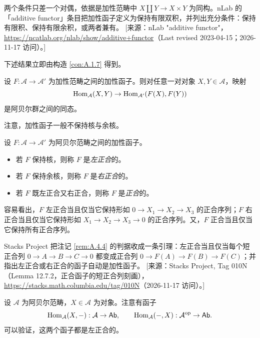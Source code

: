 \begin{yizhu}
两个条件只差一个对偶，依据是加性范畴中 $X\coprod Y\to X\times Y$ 为同构。nLab 的「additive functor」条目把加性函子定义为保持有限双积，并列出充分条件：保持有限积、保持有限余积，或两者兼有。
[来源：nLab "additive functor"，\url{https://ncatlab.org/nlab/show/additive+functor}（Last revised 2023-04-15；2026-11-17 访问）。]
\end{yizhu}

下述结果立即由构造 \ref{con:A.1.7} 得到。

\begin{lemma}\label{lem:A.4.2}
设 $F:\mathcal{A}\to\mathcal{A}'$ 为加性范畴之间的加性函子。则对任意一对对象 $X,Y\in\mathcal{A}$，映射
\[
\operatorname{Hom}_{\mathcal{A}}(X,Y)\to\operatorname{Hom}_{\mathcal{A}'}(F(X),F(Y))
\]
是阿贝尔群之间的同态。
\end{lemma}

注意，加性函子一般不保持核与余核。

\begin{definition}\label{def:A.4.3}
设 $F:\mathcal{A}\to\mathcal{A}'$ 为阿贝尔范畴之间的加性函子。
\begin{itemize}[leftmargin=2em,itemsep=0.25ex]
  \item 若 $F$ 保持核，则称 $F$ 是\emph{左正合}的。
  \item 若 $F$ 保持余核，则称 $F$ 是\emph{右正合}的。
  \item 若 $F$ 既左正合又右正合，则称 $F$ 是\emph{正合}的。
\end{itemize}
\end{definition}

\begin{remark}\label{rem:A.4.4}
容易看出，$F$ 左正合当且仅当它保持形如 $0\to X_1\to X_2\to X_3$ 的正合序列；$F$ 右正合当且仅当它保持形如 $X_1\to X_2\to X_3\to 0$ 的正合序列。又，$F$ 正合当且仅当它保持所有正合序列。
\end{remark}

\begin{yizhu}
Stacks Project 把注记 \ref{rem:A.4.4} 的判据收成一条引理：左正合当且仅当每个短正合列 $0\to A\to B\to C\to 0$ 都变成正合列 $0\to F(A)\to F(B)\to F(C)$；并指出左正合或右正合的函子自动是加性函子。
[来源：Stacks Project, Tag 010N（Lemma 12.7.2，正合函子的短正合列刻画），\url{https://stacks.math.columbia.edu/tag/010N}（2026-11-17 访问）。]
\end{yizhu}

\begin{example}\label{ex:A.4.5}
设 $\mathcal{A}$ 为阿贝尔范畴，$X\in\mathcal{A}$ 为对象。注意有函子
\[
\operatorname{Hom}_{\mathcal{A}}(X,-):\mathcal{A}\to\mathsf{Ab},\qquad
\operatorname{Hom}_{\mathcal{A}}(-,X):\mathcal{A}^{\mathrm{op}}\to\mathsf{Ab}.
\]
可以验证，这两个函子都是左正合的。
\end{example}

